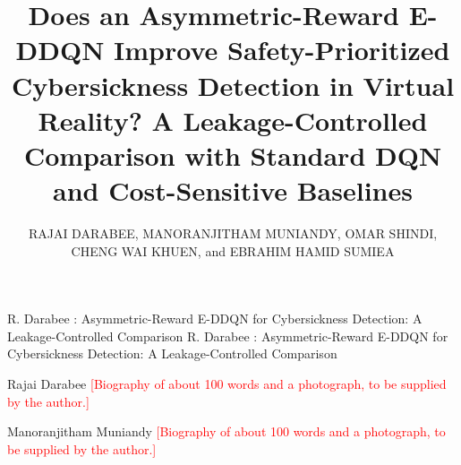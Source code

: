 \documentclass{ieeeaccess}
\newcounter{biography}  %
\newcommand{\authorinput}[1]{\textcolor{red}{[#1]}}
\begin{document}
\newlength{\xfigwd}\setlength{\xfigwd}{\columnwidth}  %

\title{Does an Asymmetric-Reward E-DDQN Improve Safety-Prioritized Cybersickness Detection in Virtual Reality? A Leakage-Controlled Comparison with Standard DQN and Cost-Sensitive Baselines}

\author{\uppercase{Rajai Darabee},
\uppercase{Manoranjitham Muniandy},
\uppercase{Omar Shindi},
\uppercase{Cheng Wai Khuen}, and
\uppercase{Ebrahim Hamid Sumiea}}

\address[1]{Faculty of Science, Management \& Computing, Universiti Teknologi PETRONAS, 32610 Seri Iskandar, Perak, Malaysia}
\address[2]{School of Information Technology, Crown Institute of Higher Education, Sydney, Australia}

\markboth
{R. Darabee \headeretal: Asymmetric-Reward E-DDQN for Cybersickness Detection: A Leakage-Controlled Comparison}
{R. Darabee \headeretal: Asymmetric-Reward E-DDQN for Cybersickness Detection: A Leakage-Controlled Comparison}




\titlepgskip=-15pt

\maketitle













\begin{IEEEbiography}{Rajai Darabee}
\authorinput{Biography of about 100 words and a photograph, to be supplied by the author.}
\end{IEEEbiography}

\begin{IEEEbiography}{Manoranjitham Muniandy}
\authorinput{Biography of about 100 words and a photograph, to be supplied by the author.}
\end{IEEEbiography}
\end{document}
